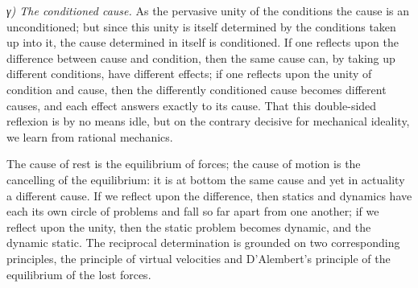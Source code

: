 \documentclass[12pt,a4paper]{book}
\newcommand{\subrunin}[1]{\emph{#1}\hspace{0.4em}}
\begin{document}
\subrunin{γ) The conditioned cause.} As the pervasive unity of the conditions the cause is an
unconditioned; but since this unity is itself determined by the conditions taken up into it,
the cause determined in itself is conditioned. If one reflects upon the difference between
cause and condition, then the same cause can, by taking up different conditions, have
different effects; if one reflects upon the unity of condition and cause, then the
differently conditioned cause becomes different causes, and each effect answers exactly to
its cause. That this double-sided reflexion is by no means idle, but on the contrary decisive
for mechanical ideality, we learn from rational mechanics.

The cause of rest is the equilibrium of forces; the cause of motion is the cancelling of the
equilibrium: it is at bottom the same cause and yet in actuality a different cause. If we
reflect upon the difference, then statics and dynamics have each its own circle of problems
and fall so far apart from one another; if we reflect upon the unity, then the static problem
becomes dynamic, and the dynamic static. The reciprocal determination is grounded on two
corresponding principles, the principle of virtual velocities and D'Alembert's principle of
the equilibrium of the lost forces.
\end{document}
